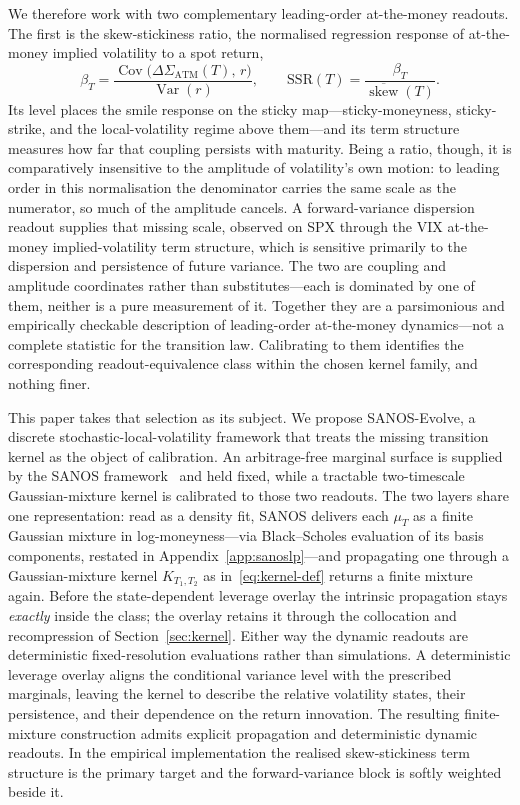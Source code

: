 \documentclass[11pt]{article}
\newcommand{\SSR}{\mathrm{SSR}}
\providecommand{\1}{\mathbf 1}
\begin{document}
We therefore work with two complementary leading-order at-the-money readouts. The first is the
skew-stickiness ratio, the normalised regression response of at-the-money implied volatility to a
spot return,
\begin{equation}\label{eq:ssr-intro}
  \beta_T=\frac{\operatorname{Cov}\bigl(\Delta\Sigma_{\mathrm{ATM}}(T),\,r\bigr)}
                {\operatorname{Var}(r)},
  \qquad
  \SSR(T)=\frac{\beta_T}{\overline{\operatorname{skew}}(T)} .
\end{equation}
Its level places the smile response on the sticky map---sticky-moneyness, sticky-strike, and the
local-volatility regime above them---and its term structure measures how far that coupling persists
with maturity. Being a ratio, though, it is comparatively insensitive to the amplitude of
volatility's own motion: to leading order in this normalisation the denominator carries the same
scale as the numerator, so much of the amplitude cancels. A forward-variance dispersion readout
supplies that missing scale, observed on SPX through the VIX at-the-money implied-volatility term
structure, which is sensitive primarily to the dispersion and persistence of future variance. The
two are coupling and amplitude coordinates rather than substitutes---each is dominated by one of
them, neither is a pure measurement of it. Together they are a parsimonious and empirically checkable description of
leading-order at-the-money dynamics---not a complete statistic for the transition law. Calibrating
to them identifies the corresponding readout-equivalence class within the chosen kernel family, and
nothing finer.

This paper takes that selection as its subject. We propose SANOS-Evolve, a discrete
stochastic-local-volatility framework that treats the missing transition kernel as the object of
calibration. An arbitrage-free marginal surface is supplied by the SANOS
framework~\cite{buehler2026sanos} and held fixed, while a tractable two-timescale Gaussian-mixture
kernel is calibrated to those two readouts. The two layers share one representation: read as a density fit,
SANOS delivers each $\mu_T$ as a finite Gaussian mixture in log-moneyness---via Black--Scholes
evaluation of its basis components, restated in Appendix~\ref{app:sanoslp}---and propagating one
through a Gaussian-mixture kernel $K_{T_1,T_2}$ as in~\eqref{eq:kernel-def} returns a finite mixture
again. Before the state-dependent leverage overlay the intrinsic propagation stays \emph{exactly}
inside the class; the overlay retains it through the collocation and recompression of
Section~\ref{sec:kernel}. Either way the dynamic readouts are deterministic fixed-resolution
evaluations rather than simulations. A deterministic leverage overlay aligns the conditional variance level with the prescribed marginals,
leaving the kernel to describe the relative volatility states, their persistence, and their
dependence on the return innovation. The resulting finite-mixture construction admits explicit
propagation and deterministic dynamic readouts. In the empirical implementation the realised
skew-stickiness term structure is the primary target and the forward-variance block is softly
weighted beside it.
\end{document}
